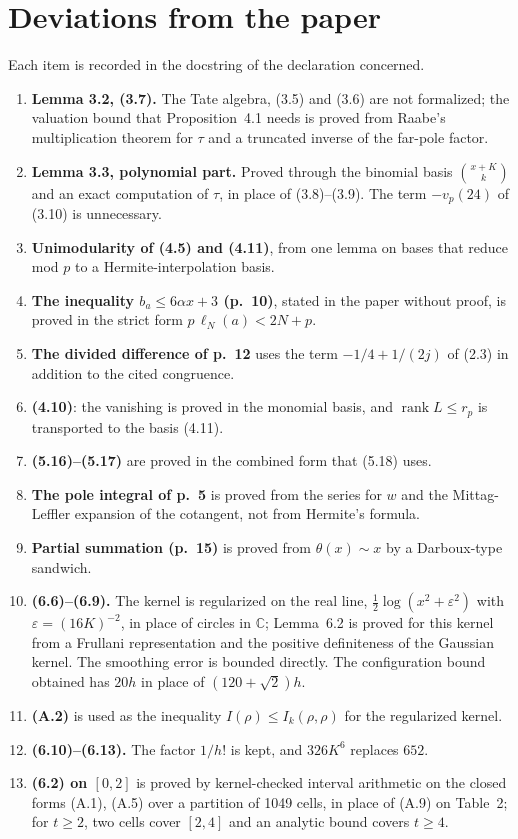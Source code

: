 \documentclass[11pt]{article}
\begin{document}
\section{Deviations from the paper}\label{sec:dev}

Each item is recorded in the docstring of the declaration concerned.
\begin{enumerate}
\item \textbf{Lemma 3.2, (3.7).} The Tate algebra, (3.5) and (3.6) are not formalized; the
valuation bound that Proposition~4.1 needs is proved from Raabe's multiplication theorem for
$\tau$ and a truncated inverse of the far-pole factor.
\item \textbf{Lemma 3.3, polynomial part.} Proved through the binomial basis $\binom{x+K}{k}$
and an exact computation of $\tau$, in place of (3.8)--(3.9). The term $-v_p(24)$ of (3.10) is
unnecessary.
\item \textbf{Unimodularity of (4.5) and (4.11)}, from one lemma on bases that reduce mod $p$ to
a Hermite-interpolation basis.
\item \textbf{The inequality $b_a\le 6\alpha x+3$ (p.~10)}, stated in the paper without proof,
is proved in the strict form $p\,\ell_N(a) < 2N+p$.
\item \textbf{The divided difference of p.~12} uses the term $-1/4+1/(2j)$ of (2.3) in addition
to the cited congruence.
\item \textbf{(4.10)}: the vanishing is proved in the monomial basis, and
$\operatorname{rank}L\le r_p$ is transported to the basis (4.11).
\item \textbf{(5.16)--(5.17)} are proved in the combined form that (5.18) uses.
\item \textbf{The pole integral of p.~5} is proved from the series for $w$ and the
Mittag-Leffler expansion of the cotangent, not from Hermite's formula.
\item \textbf{Partial summation (p.~15)} is proved from $\theta(x)\sim x$ by a Darboux-type
sandwich.
\item \textbf{(6.6)--(6.9).} The kernel is regularized on the real line,
$\tfrac12\log(x^2+\varepsilon^2)$ with $\varepsilon=(16K)^{-2}$, in place of circles in
$\mathbb{C}$; Lemma~6.2 is proved for this kernel from a Frullani representation and the
positive definiteness of the Gaussian kernel. The smoothing error is bounded directly. The
configuration bound obtained has $20h$ in place of $(120+\sqrt2)h$.
\item \textbf{(A.2)} is used as the inequality $I(\rho)\le I_k(\rho,\rho)$ for the regularized
kernel.
\item \textbf{(6.10)--(6.13).} The factor $1/h!$ is kept, and $326K^6$ replaces $652$.
\item \textbf{(6.2) on $[0,2]$} is proved by kernel-checked interval arithmetic on the closed
forms (A.1), (A.5) over a partition of 1049 cells, in place of (A.9) on Table~2; for $t\ge2$,
two cells cover $[2,4]$ and an analytic bound covers $t\ge4$.
\end{enumerate}
\end{document}
